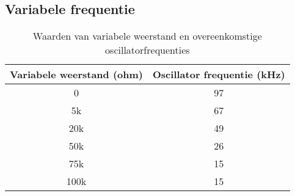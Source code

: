 \subsection{Variabele frequentie}
\begin{table}[h!]
\centering
\begin{tabular}{|c|c|}
\hline
\textbf{Variabele weerstand (ohm)} & \textbf{Oscillator frequentie (kHz)} \\ \hline
0 & 97 \\ \hline
5k & 67 \\ \hline
20k & 49 \\ \hline
50k & 26 \\ \hline
75k & 15 \\ \hline
100k & 15 \\ \hline
\end{tabular}
\caption{Waarden van variabele weerstand en overeenkomstige oscillatorfrequenties}
\label{tab:oscillator_frequentie}
\end{table}
